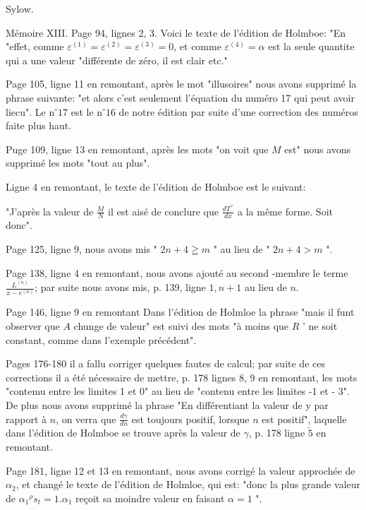 \documentclass{article}
\begin{document}
Sylow.

Mémoire XIII. Page 94, lignes 2, 3. Voici le texte de l'édition de Holmboe: "En "effet, comme \(\varepsilon^{(1)}=\varepsilon^{(2)}=\varepsilon^{(3)}=0\), et comme \(\varepsilon^{(4)}=\alpha\) est la seule quantite qui a une valeur "différente de zéro, il est clair etc."

Page 105, ligne 11 en remontant, après le mot "illusoires" nous avons supprimé la phrase suivante: "et alors c'est seulement l'équation du numéro 17 qui peut avoir liecu". Le \(\mathrm{n}^{\circ} 17\) est le \(\mathrm{n}^{\circ} 16\) de notre édition par suite d'une correction des numéros faite plus haut.

Puge 109, ligne 13 en remontant, après les mots "on voit que \(M\) est" nous avons supprimé les mots "tout au plus".

Ligne 4 en remontant, le texte de l'édition de Holmboe est le suivant:

"J'après la valeur de \(\frac{M}{N}\) il est aisé de conclure que \(\frac{d T^{\prime \prime}}{d x}\) a la même forme. Soit donc".

Page 125, ligne 9, nous avons mis " \(2 n+4 \geqq m\) " au lieu de " \(2 n+4>m\) ".

Page 138, ligne 4 en remontant, nous avons ajouté au second -membre le terme \(\frac{L^{(n)}}{x-e^{(n)}}\); par suite nous avons mis, p. 139, ligne \(1, n+1\) au lieu de \(n\).

Page 146, ligne 9 en remontant Dans l'édition de Holmloe la phrase "mais il funt observer que \(A\) chunge de valeur" est suivi des mots "à moins que \(R\) ' ne soit constant, comme dans l'exemple précédent".

Pages 176-180 il a fallu corriger quelques fautes de calcul; par suite de ces corrections il a été nécessaire de mettre, p. 178 lignes 8, 9 en remontant, les mots "contemu entre les limites 1 et 0" au lieu de "contenu entre les limites -1 et - 3". De plus nous avons supprimé la phrase "En différentiant la valeur de y par rapport à \(n\), on verra que \(\frac{d \gamma}{d n}\) est toujours positif, lorsque \(n\) est positif", laquelle dans l'édition de Holmboe se trouve après la valeur de \(\gamma\), p. 178 ligne \(\check{5}\) en remontant.

Page 181, ligne 12 et 13 en remontant, nous avons corrigé la valeur approchée de \(\alpha_{2}\), et changé le texte de l'édition de Holmloe, qui est: "donc la plus grande valeur de \(\alpha_{1}{ }^{\rho} s_{t}=1 . \alpha_{1}\) reçoit sa moindre valeur en faisant \(\alpha=1\) ".
\end{document}
